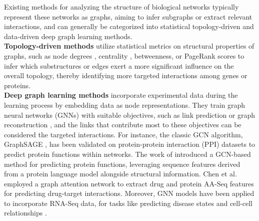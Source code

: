 
Existing methods for analyzing the structure of biological networks typically represent these networks as graphs, aiming to infer subgraphs or extract relevant interactions, and can generally be categorized into statistical topology-driven and data-driven deep graph learning methods.\\
\textbf{Topology-driven methods} utilize statistical metrics on structural properties of graphs, such as node degrees \cite{RSS,RSS1}, centrality \cite{MDS,MDS1,NACHER201657}, betweenness, or PageRank scores \cite{PMID:21149343,PPR1} to infer which substructures or edges exert a more significant influence on the overall topology, thereby identifying more targeted interactions among genes or proteins.\\
\textbf{Deep graph learning methods} incorporate experimental data during the learning process by embedding data as node representations.
They train graph neural networks (GNNs) with suitable objectives, such as link prediction or graph reconstruction \cite{GNNB2,GNNB1,GNNB3}, and the links that contribute most to these objectives can be considered the targeted interactions.
For instance, the classic GCN algorithm, GraphSAGE \cite{GraphSAGE}, has been validated on protein-protein interaction (PPI) datasets to predict protein functions within networks.
The work of \cite{GCN1} introduced a GCN-based method for predicting protein functions, leveraging sequence features derived from a protein language model alongside structural information.
Chen et al. \cite{GAT1} employed a graph attention network to extract drug and protein AA-Seq features for predicting drug-target interactions.
Moreover, GNN models have been applied to incorporate RNA-Seq data, for tasks like predicting disease states and cell-cell relationships \cite{GNNS1, GNNS2}.


